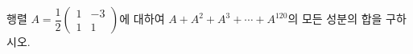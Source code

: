 행렬 $A=\dfrac{1}{2}\begin{pmatrix} 1 & -3 \\ 1 & 1 \end{pmatrix}$에 대하여 $A+A^2+A^3+\cdots+A^{120}$의 모든 성분의 합을 구하시오.

